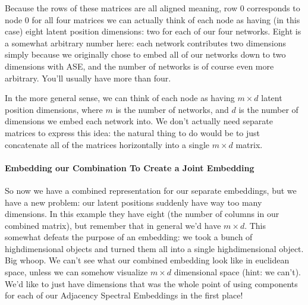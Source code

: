 \documentclass[letterpaper,10pt,english]{jupyterBook}
\begin{document}
\noindent{}

\sphinxAtStartPar
Because the rows of these matrices are all aligned \sphinxhyphen{} meaning, row 0 corresponds to node 0 for all four matrices \sphinxhyphen{} we can actually think of each node as having (in this case) eight latent position dimensions: two for each of our four networks. Eight is a somewhat arbitrary number here: each network contributes two dimensions simply because we originally chose to embed all of our networks down to two dimensions with ASE, and the number of networks is of course even more arbitrary. You’ll usually have more than four.

\sphinxAtStartPar
In the more general sense, we can think of each node as having \(m \times d\) latent position dimensions, where \(m\) is the number of networks, and \(d\) is the number of dimensions we embed each network into. We don’t actually need separate matrices to express this idea: the natural thing to do would be to just concatenate all of the matrices horizontally into a single \(m \times d\) matrix.

\begin{sphinxVerbatim}[commandchars=\\\{\}]
  
\end{sphinxVerbatim}

\noindent{}


\paragraph{Embedding our Combination To Create a Joint Embedding}
\label{\detokenize{representations/ch6/multigraph-representation-learning:embedding-our-combination-to-create-a-joint-embedding}}
\sphinxAtStartPar
So now we have a combined representation for our separate embeddings, but we have a new problem: our latent positions suddenly have way too many dimensions. In this example they have eight (the number of columns in our combined matrix), but remember that in general we’d have \(m \times d\). This somewhat defeats the purpose of an embedding: we took a bunch of high\sphinxhyphen{}dimensional objects and turned them all into a single high\sphinxhyphen{}dimensional object. Big whoop. We can’t see what our combined embedding look like in euclidean space, unless we can somehow visualize \(m \times d\) dimensional space (hint: we can’t). We’d like to just have  dimensions \sphinxhyphen{} that was the whole point of using  components for each of our Adjacency Spectral Embeddings in the first place!
\end{document}
